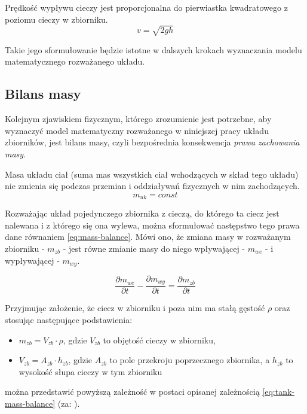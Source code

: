 \begin{torricelli}
    Prędkość wypływu cieczy jest proporcjonalna do pierwiastka kwadratowego z poziomu cieczy w zbiorniku.
    \begin{equation}\label{eq:torricelli}
    v = \sqrt{2gh}
    \end{equation}
\end{torricelli}
Takie jego sformułowanie będzie istotne w dalszych krokach wyznaczania modelu matematycznego rozważanego układu.


\subsection{Bilans masy}
\label{sub:plyny-bilans}

Kolejnym zjawiskiem fizycznym, którego zrozumienie jest potrzebne, aby wyznaczyć model matematyczny rozważanego w niniejszej pracy układu zbiorników, jest bilans masy, czyli bezpośrednia konsekwencja \emph{prawa zachowania masy}.

\begin{mass}
    Masa układu ciał (suma mas wszystkich ciał wchodzących w skład tego układu) nie zmienia się podczas przemian i oddziaływań fizycznych w nim zachodzących.
    \begin{equation}\label{eq:mass-conservation}
        m_{uk} = const
    \end{equation}
\end{mass}

Rozważając układ pojedynczego zbiornika z cieczą, do którego ta ciecz jest nalewana i z którego się ona wylewa, można sformułować następstwo tego prawa dane równaniem \ref{eq:mass-balance}. Mówi ono, że zmiana masy w rozważanym zbiorniku - $m_{zb}$ - jest równe zmianie masy do niego wpływającej - $m_{we}$ - i wypływającej - $m_{wy}$.

\begin{equation}\label{eq:mass-balance}
    \frac{\partial m_{we}}{\partial t} - \frac{\partial m_{wy}}{\partial t} =\frac{\partial m_{zb}}{\partial t}
\end{equation}

Przyjmując założenie, że ciecz w zbiorniku i poza nim ma stałą gęstość $\rho$ oraz stosując następujące podstawienia:
\begin{itemize}
    \item $m_{zb} = V_{zb}\cdot\rho$, gdzie $V_{zb}$ to objętość cieczy w zbiorniku,
    \item $V_{zb} = A_{zb} \cdot h_{zb}$, gdzie $A_{zb}$ to pole przekroju poprzecznego zbiornika, a $h_{zb}$ to wysokość słupa cieczy w tym zbiorniku
\end{itemize}
można przedstawić powyższą zależność w postaci opisanej zależnością \ref{eq:tank-mass-balance} (za: \cite{Postlethwaite}).

